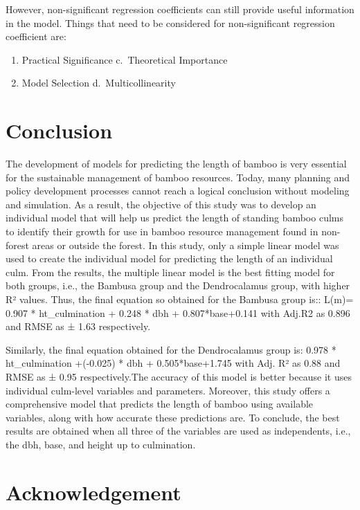 \documentclass[preprint, 3p,
authoryear]{elsarticle} %
\begin{document}
However, non-significant regression coefficients can still provide
useful information in the model. Things that need to be considered for
non-significant regression coefficient are:

\begin{enumerate}
\def\labelenumi{\alph{enumi}.}
\item
  Practical Significance c.~Theoretical Importance
\item
  Model Selection d.~Multicollinearity
\end{enumerate}

\hypertarget{conclusion}{%
\section{Conclusion}\label{conclusion}}

The development of models for predicting the length of bamboo is very
essential for the sustainable management of bamboo resources. Today,
many planning and policy development processes cannot reach a logical
conclusion without modeling and simulation. As a result, the objective
of this study was to develop an individual model that will help us
predict the length of standing bamboo culms to identify their growth for
use in bamboo resource management found in non-forest areas or outside
the forest. In this study, only a simple linear model was used to create
the individual model for predicting the length of an individual culm.
From the results, the multiple linear model is the best fitting model
for both groups, i.e., the Bambusa group and the Dendrocalamus group,
with higher R² values. Thus, the final equation so obtained for the
Bambusa group is:: L(m)= 0.907 * ht\_culmination + 0.248 * dbh +
0.807*base+0.141 with Adj.R2 as 0.896 and RMSE as ± 1.63 respectively.

Similarly, the final equation obtained for the Dendrocalamus group is:
0.978 * ht\_culmination +(-0.025) * dbh + 0.505*base+1.745 with Adj. R²
as 0.88 and RMSE as ± 0.95 respectively.The accuracy of this model is
better because it uses individual culm-level variables and parameters.
Moreover, this study offers a comprehensive model that predicts the
length of bamboo using available variables, along with how accurate
these predictions are. To conclude, the best results are obtained when
all three of the variables are used as independents, i.e., the dbh,
base, and height up to culmination.

\hypertarget{acknowledgement}{%
\section{Acknowledgement}\label{acknowledgement}}
\end{document}
